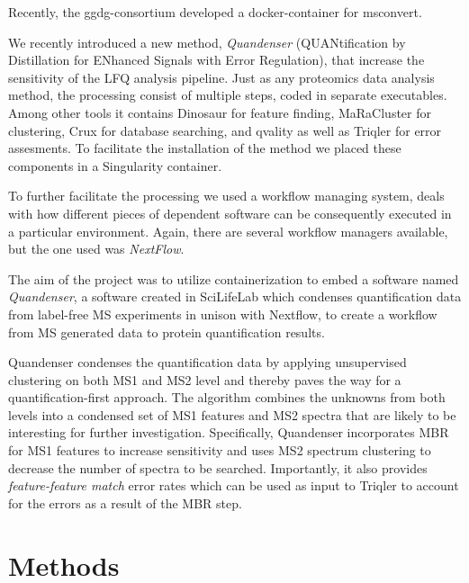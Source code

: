 \documentclass[11pt]{article}
\begin{document}
Recently, the ggdg-consortium developed a docker-container for msconvert.



We recently introduced a new method, {\em Quandenser} (QUANtification by
Distillation for ENhanced Signals with Error Regulation), that increase the sensitivity of the LFQ
analysis pipeline. Just as any proteomics data analysis method, the processing consist of multiple steps, coded in separate executables. Among other tools it contains Dinosaur\cite{teleman2016dinosaur} for feature finding, MaRaCluster\cite{the2016maracluster} for clustering, Crux\cite{mcilwain2014} for database searching, and qvality\cite{kall2008non} as well as Triqler\cite{the2018integrated} for error assesments. To facilitate the installation of the method we placed these components in a  Singularity container.

To further facilitate the processing we used a workflow managing system, deals with how different pieces of dependent software can be consequently executed in a particular environment. Again, there are several workflow managers available, but the one used was \textit{NextFlow}\cite{di2017nextflow}.

The aim of the project was to utilize containerization to embed a software named \textit{Quandenser}, a software created in SciLifeLab which condenses quantification data from label-free MS experiments \cite{quandenser} in unison with Nextflow, to create a workflow from MS generated data to protein quantification results.





Quandenser condenses the quantification data by applying
unsupervised clustering on both MS1 and MS2 level and thereby paves the way for
a quantification-first approach. The algorithm combines the unknowns from both
levels into a condensed set of MS1 features and MS2 spectra that are likely to
be interesting for further investigation. Specifically, Quandenser incorporates
MBR for MS1 features to increase sensitivity and uses MS2 spectrum clustering
to decrease the number of spectra to be searched. Importantly, it also provides
{\em feature-feature match} error rates which can be used as input to Triqler
to account for the errors as a result of the MBR step.



\section*{Methods}
\end{document}
